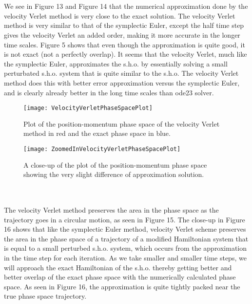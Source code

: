 \documentclass[12pt]{article}
\begin{document}
\\\\\indent We see in Figure 13 and Figure 14 that the numerical approximation done by the velocity Verlet method is very close to the exact solution. The velocity Verlet method is very similar to that of the symplectic Euler, except the half time step gives the velocity Verlet an added order, making it more accurate in the longer time scales. Figure 5 shows that even though the approximation is quite good, it is not exact (not a perfectly overlap). It seems that the velocity Verlet, much like the symplectic Euler, approximates the s.h.o. by essentially solving a small perturbated s.h.o. system that is quite similar to the s.h.o. The velocity Verlet method does this with better error approximation versus the symplectic Euler, and is clearly already better in the long time scales than ode23 solver.
\begin{figure}[h!]
\begin{minipage}[b]{0.45\linewidth}
\centering
\texttt{[image: VelocityVerletPhaseSpacePlot]}
\caption{Plot of the position-momentum phase space of the velocity Verlet method in red and the exact phase space in blue.}
\label{fig:figure15}
\end{minipage}
\hspace{0.5cm}
\begin{minipage}[b]{0.45\linewidth}
\centering
\texttt{[image: ZoomedInVelocityVerletPhaseSpacePlot]}
\caption{A close-up of the plot of the position-momentum phase space showing the very slight difference of approximation solution.}
\label{fig:figure16}
\end{minipage}
\end{figure}
\\\\\indent   The velocity Verlet method preserves the area in the phase space as the trajectory goes in a circular motion, as seen in Figure 15. The close-up in Figure 16 shows that like the symplectic Euler method, velocity Verlet scheme preserves the area in the phase space of a trajectory of a modified Hamiltonian system that is equal to a small perturbed s.h.o. system, which occurs from the approximation in the time step for each iteration. As we take smaller and smaller time steps, we will approach the exact Hamiltonian of the s.h.o. thereby getting better and better overlap of the exact phase space with the numerically calculated phase space. As seen in Figure 16, the approximation is quite tightly packed near the true phase space trajectory.
\end{document}
